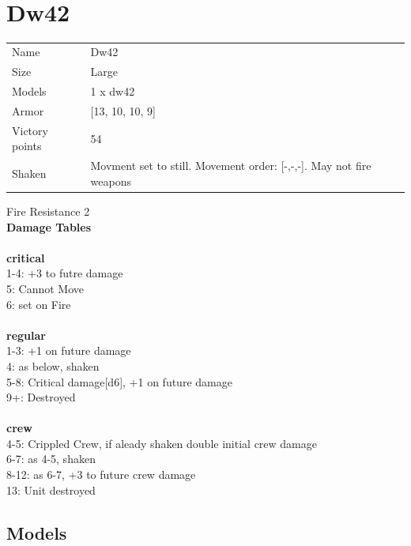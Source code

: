  
\ \\














\clearpage

\section{ Dw42 }

\begin{tabular}{ll}
  Name & Dw42 \\
  Size & Large\\
  Models & 1 x dw42\\
  Armor & [13, 10, 10, 9]\\
  Victory points & 54\\
  Shaken & Movment set to still. Movement order: [-,-,-]. May not fire weapons\\
\end{tabular}

Fire Resistance 2\\ 



{\bf Damage Tables} \\
\ \\ {\bf critical } \\
1-4: +3 to futre damage \\
5: Cannot Move \\
6: set on Fire \\
\ \\ {\bf regular } \\
1-3: +1 on future damage \\
4: as below, shaken \\
5-8: Critical damage[d6], +1 on future damage \\
9+: Destroyed \\
\ \\ {\bf crew } \\
4-5: Crippled Crew, if aleady shaken double initial crew damage \\
6-7: as 4-5, shaken \\
8-12: as 6-7, +3 to future crew damage \\
13: Unit destroyed \\


\clearpage

\subsection{ Models }

